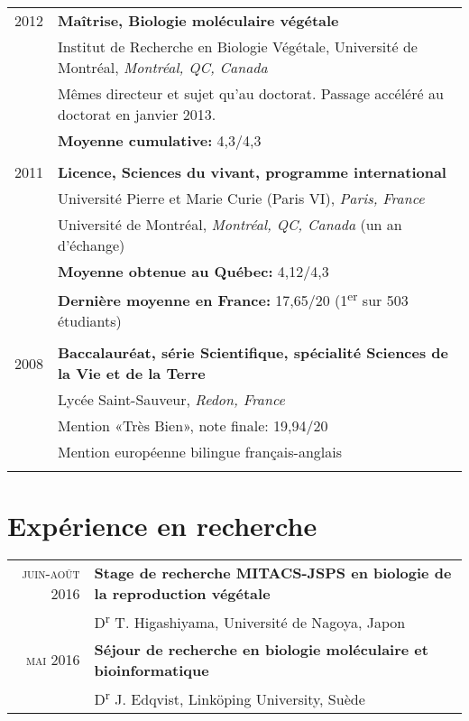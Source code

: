 \documentclass[letterpaper,10pt]{article}
\begin{document}
{\begin{tabular}{r|p{14cm}}
 2012 & \textbf{Maîtrise, Biologie moléculaire végétale} \\
 & Institut de Recherche en Biologie Végétale, Université de Montréal, \emph{Montréal, QC, Canada}\\
 & {\small Mêmes directeur et sujet qu'au doctorat. Passage accéléré au doctorat en janvier 2013.}\\
 & {\small \textbf{Moyenne cumulative:} 4,3/4,3}\\
 \multicolumn{2}{c}{} \\

 2011 & \textbf{Licence, Sciences du vivant, programme international} \\
 & Université Pierre et Marie Curie (Paris VI), \emph{Paris, France}\\
 & Université de Montréal, \emph{Montréal, QC, Canada} (un an d'échange)\\
 & {\small \textbf{Moyenne obtenue au Québec:} 4,12/4,3}\\
 & {\small \textbf{Dernière moyenne en France:} 17,65/20  (1\textsuperscript{er} sur 503 étudiants)}\\
 \multicolumn{2}{c}{} \\

 2008 & \textbf{Baccalauréat, série Scientifique, spécialité Sciences de la Vie et de la Terre} \\
 & Lycée Saint-Sauveur, \emph{Redon, France}\\
 & {\small Mention «Très Bien», note finale: 19,94/20}\\
 & {\small Mention européenne bilingue français-anglais}\\
 \multicolumn{2}{c}{} \\
\end{tabular}

\section{Expérience en recherche}
\begin{tabular}{r|p{12.5cm}}

\textsc{juin-août 2016} & \textbf{Stage de recherche MITACS-JSPS en biologie de la reproduction végétale} \\
& D\textsuperscript{r} T. Higashiyama, Université de Nagoya, Japon  \vspace{1.5mm} \\

\textsc{mai 2016} & \textbf{Séjour de recherche en biologie moléculaire et bioinformatique} \\
& D\textsuperscript{r} J. Edqvist, Linköping University, Suède  \vspace{1.5mm} \\


\end{tabular}}
\end{document}
